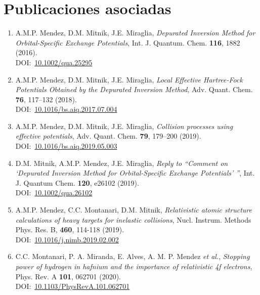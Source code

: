 \chapter*{Publicaciones asociadas}
\label{chap:publicaciones}

\begin{enumerate}

\item
A.M.P. Mendez, D.M. Mitnik, J.E. Miraglia,
\textit{Depurated Inversion Method for Orbital-Specific Exchange Potentials},
Int. J. Quantum. Chem. \textbf{116}, 1882 (2016). \\
DOI:~\href{http://www.doi.org/10.1002/qua.25295}{10.1002/qua.25295}

\item
A.M.P. Mendez, D.M. Mitnik, J.E. Miraglia, 
\textit{Local Effective Hartree-Fock Potentials Obtained by the Depurated Inversion Method},
Adv. Quant. Chem. \textbf{76}, 117--132 (2018). \\
DOI:~\href{http://www.doi.org/10.1016/bs.aiq.2017.07.004}{10.1016/bs.aiq.2017.07.004}

\item
A.M.P. Mendez, D.M. Mitnik, J.E. Miraglia, 
\textit{Collision processes using effective potentials},
Adv. Quant. Chem. \textbf{79}, 179--200 (2019). \\
DOI:~\href{http://www.doi.org/10.1016/bs.aiq.2019.05.003}{10.1016/bs.aiq.2019.05.003}

\item
D.M. Mitnik, A.M.P. Mendez, J.E. Miraglia, 
\textit{Reply to ``Comment on `Depurated Inversion Method for Orbital-Specific
Exchange Potentials' ''}, 
Int. J. Quantum Chem. \textbf{120}, e26102 (2019). \\
DOI:~\href{http://www.doi.org/10.1002/qua.26102}{10.1002/qua.26102}

\item
A.M.P. Mendez, C.C. Montanari, D.M. Mitnik, 
\textit{Relativistic atomic structure calculations of heavy targets for inelastic collisions},
Nucl. Instrum. Methods Phys. Res. B, \textbf{460}, 114-118 (2019). \\
DOI:~\href{http://www.doi.org/10.1016/j.nimb.2019.02.002}{10.1016/j.nimb.2019.02.002}

\item
C.C. Montanari, P. A. Miranda, E. Alves, A. M. P. Mendez \textit{et al.},
\textit{Stopping power of hydrogen in hafnium and the importance of relativistic 4f electrons},
Phys. Rev. A \textbf{101}, 062701 (2020). \\
DOI:~\href{http://www.doi.org/10.1103/PhysRevA.101.062701}{10.1103/PhysRevA.101.062701} \\ \\


\end{enumerate}
